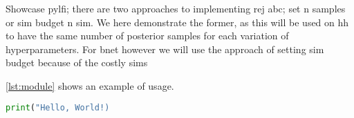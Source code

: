 Showcase pylfi; there are two approaches to implementing rej abc; set n samples or sim budget n sim. We here demonstrate the former, as this will be used on hh to have the same number of posterior samples for each variation of hyperparameters. For bnet however we will use the approach of setting sim budget because of the costly sims


\cref{lst:module} shows an example of usage.
\begin{lstlisting}[language=python, label={lst:module}, caption={Example usage of the .}]
print("Hello, World!)
\end{lstlisting}







